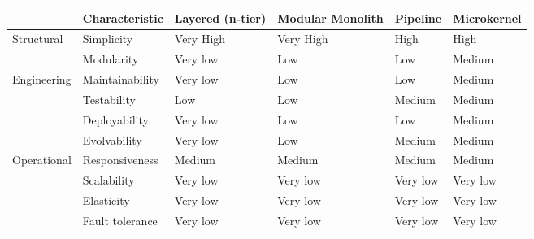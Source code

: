 \begin{table}[h!]
  \renewcommand{\arraystretch}{1.4}
  \centering
  \begin{tabular}{l l l l l l}
    \toprule
                & \textbf{Characteristic} & \textbf{Layered (n-tier)} & \textbf{Modular Monolith} & \textbf{Pipeline} & \textbf{Microkernel} \\
    \midrule
    Structural  & Simplicity              & Very High                 & Very High                 & High              & High                 \\
                & Modularity              & Very low                  & Low                       & Low               & Medium               \\
    \midrule
    Engineering & Maintainability         & Very low                  & Low                       & Low               & Medium               \\
                & Testability             & Low                       & Low                       & Medium            & Medium               \\
                & Deployability           & Very low                  & Low                       & Low               & Medium               \\
                & Evolvability            & Very low                  & Low                       & Medium            & Medium               \\
    \midrule
    Operational & Responsiveness          & Medium                    & Medium                    & Medium            & Medium               \\
                & Scalability             & Very low                  & Very low                  & Very low          & Very low             \\
                & Elasticity              & Very low                  & Very low                  & Very low          & Very low             \\
                & Fault tolerance         & Very low                  & Very low                  & Very low          & Very low             \\
    \bottomrule
  \end{tabular}
\end{table}
